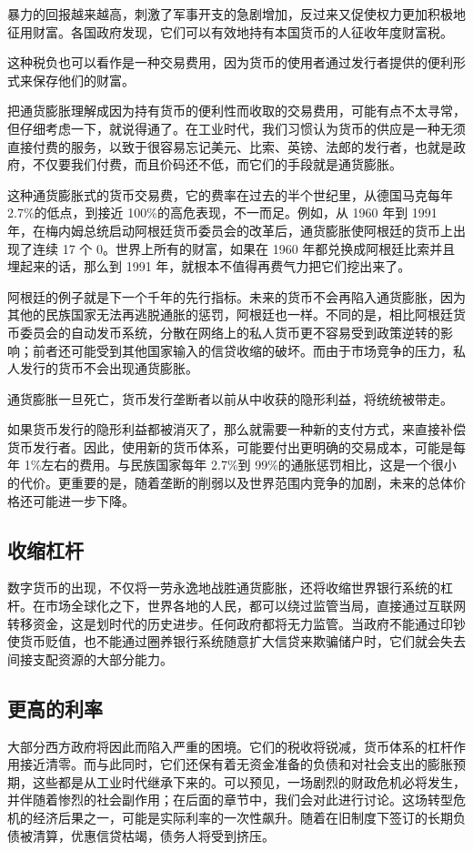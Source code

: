 暴力的回报越来越高，刺激了军事开支的急剧增加，反过来又促使权力更加积极地征用财富。各国政府发现，它们可以有效地持有本国货币的人征收年度财富税。

这种税负也可以看作是一种交易费用，因为货币的使用者通过发行者提供的便利形式来保存他们的财富。

把通货膨胀理解成因为持有货币的便利性而收取的交易费用，可能有点不太寻常，但仔细考虑一下，就说得通了。在工业时代，我们习惯认为货币的供应是一种无须直接付费的服务，以致于很容易忘记美元、比索、英镑、法郎的发行者，也就是政府，不仅要我们付费，而且价码还不低，而它们的手段就是通货膨胀。

这种通货膨胀式的货币交易费，它的费率在过去的半个世纪里，从德国马克每年2.7\%的低点，到接近 100\%的高危表现，不一而足。例如，从 1960 年到 1991 年，在梅内姆总统启动阿根廷货币委员会的改革后，通货膨胀使阿根廷的货币上出现了连续 17 个 0。世界上所有的财富，如果在 1960 年都兑换成阿根廷比索并且埋起来的话，那么到 1991 年，就根本不值得再费气力把它们挖出来了。

阿根廷的例子就是下一个千年的先行指标。未来的货币不会再陷入通货膨胀，因为其他的民族国家无法再逃脱通胀的惩罚，阿根廷也一样。不同的是，相比阿根廷货币委员会的自动发币系统，分散在网络上的私人货币更不容易受到政策逆转的影响；前者还可能受到其他国家输入的信贷收缩的破坏。而由于市场竞争的压力，私人发行的货币不会出现通货膨胀。

通货膨胀一旦死亡，货币发行垄断者以前从中收获的隐形利益，将统统被带走。

如果货币发行的隐形利益都被消灭了，那么就需要一种新的支付方式，来直接补偿货币发行者。因此，使用新的货币体系，可能要付出更明确的交易成本，可能是每年 1\%左右的费用。与民族国家每年 2.7\%到 99\%的通胀惩罚相比，这是一个很小的代价。更重要的是，随着垄断的削弱以及世界范围内竞争的加剧，未来的总体价格还可能进一步下降。

\subsection{收缩杠杆}
数字货币的出现，不仅将一劳永逸地战胜通货膨胀，还将收缩世界银行系统的杠杆。在市场全球化之下，世界各地的人民，都可以绕过监管当局，直接通过互联网转移资金，这是划时代的历史进步。任何政府都将无力监管。当政府不能通过印钞使货币贬值，也不能通过圈养银行系统随意扩大信贷来欺骗储户时，它们就会失去间接支配资源的大部分能力。

\subsection{更高的利率}
大部分西方政府将因此而陷入严重的困境。它们的税收将锐减，货币体系的杠杆作用接近清零。而与此同时，它们还保有着无资金准备的负债和对社会支出的膨胀预期，这些都是从工业时代继承下来的。可以预见，一场剧烈的财政危机必将发生，并伴随着惨烈的社会副作用；在后面的章节中，我们会对此进行讨论。这场转型危机的经济后果之一，可能是实际利率的一次性飙升。随着在旧制度下签订的长期负债被清算，优惠信贷枯竭，债务人将受到挤压。

